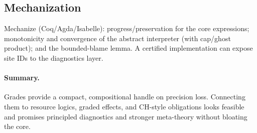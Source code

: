 \subsection{Mechanization}
Mechanize (Coq/Agda/Isabelle): progress/preservation for the core expressions; monotonicity and convergence of the abstract interpreter (with cap/ghost product); and the bounded-blame lemma. A certified implementation can expose site IDs to the diagnostics layer.

\paragraph{Summary.}
Grades provide a compact, compositional handle on precision loss. Connecting them to resource logics, graded effects, and CH-style obligations looks feasible and promises principled diagnostics and stronger meta-theory without bloating the core.
